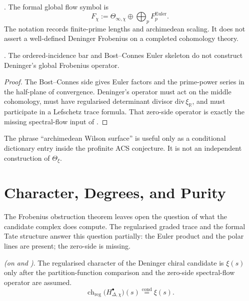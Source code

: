 \begin{definition}
\label{v4-arith:w8-a:def:F-global}
\ClaimStatusDefinitional. The formal global flow symbol is
\begin{equation}
\label{v4-arith:w8-a:eq:F-global}
F_\chi:=
\Theta_{\infty,\chi}\oplus\bigoplus_p F^{\mathrm{Euler}}_p.
\end{equation}
The notation records finite-prime lengths and archimedean scaling. It
does not assert a well-defined Deninger Frobenius on a completed
cohomology theory.
\end{definition}

\begin{theorem}
\label{v4-arith:w8-a:thm:F-global-welldef}
\ClaimStatusProvedHere. The ordered-incidence bar and Bost--Connes
Euler skeleton do not construct Deninger's global Frobenius operator.
\end{theorem}

\begin{proof}
The Bost--Connes side gives Euler factors and the prime-power series
in the half-plane of convergence. Deninger's operator must act on the
middle cohomology, must have regularised determinant divisor
\(\mathrm{div}\,\xi_{\mathbb R}\), and must participate in a
Lefschetz trace formula. That zero-side operator is exactly the missing
spectral-flow input of
.
\end{proof}

\begin{remark}
\label{v4-arith:w8-a:rem:wilson-infinity}
The phrase ``archimedean Wilson surface'' is useful only as a
conditional dictionary entry inside the profinite ACS conjecture. It
is not an independent construction of \(\Theta_\xi\).
\end{remark}

\section{Character, Degrees, and Purity}
\label{v4-arith:w8-a:character}
\label{v4-arith:w8-a:H-structure}

The Frobenius obstruction theorem leaves open the question of what the
candidate complex does compute. The regularised graded trace and the
formal Tate structure answer this question partially: the Euler product
and the polar lines are present; the zero-side is missing.

\begin{theorem}
\label{v4-arith:w8-a:thm:character-identity}
\ClaimStatusConditional \emph{(on
 and
)}. The regularised
character of the Deninger chiral candidate is \(\xi(s)\) only after
the partition-function comparison and the zero-side spectral-flow
operator are assumed.
\begin{equation}
\label{v4-arith:w8-a:eq:character}
\operatorname{ch}_{\mathrm{reg}}
\bigl(H^\bullet_{\Delta,\chi}\bigr)(s)
\stackrel{\mathrm{cond}}{=}
\xi(s).
\end{equation}
\end{theorem}

